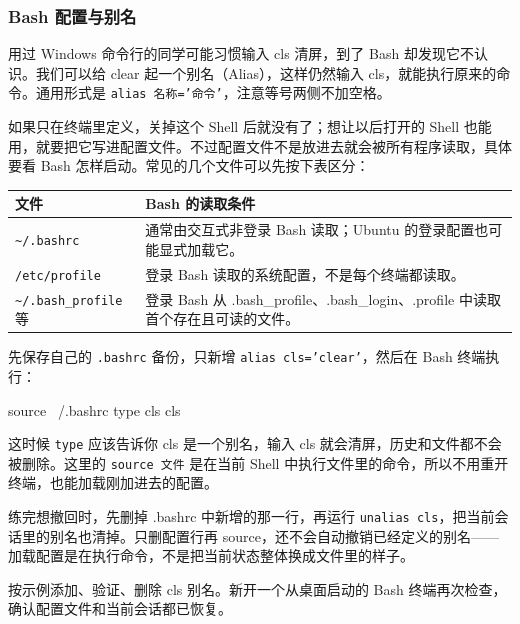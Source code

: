 \subsubsection{Bash 配置与别名}
\label{sec:bash-config}
用过 Windows 命令行的同学可能习惯输入 cls 清屏，到了 Bash 却发现它不认识。我们可以给 clear 起一个别名（Alias），这样仍然输入 cls，就能执行原来的命令。通用形式是 \texttt{alias 名称='命令'}，注意等号两侧不加空格。

如果只在终端里定义，关掉这个 Shell 后就没有了；想让以后打开的 Shell 也能用，就要把它写进配置文件。不过配置文件不是放进去就会被所有程序读取，具体要看 Bash 怎样启动。常见的几个文件可以先按下表区分：
\begin{center}
\begin{tabular}{p{}p{}}
\toprule
文件 & Bash 的读取条件\\
\midrule
\texttt{\textasciitilde/.bashrc} & 通常由交互式非登录 Bash 读取；Ubuntu 的登录配置也可能显式加载它。\\
\texttt{/etc/profile} & 登录 Bash 读取的系统配置，不是每个终端都读取。\\
\texttt{\textasciitilde/.bash\_profile} 等 & 登录 Bash 从 .bash\_profile、.bash\_login、.profile 中读取首个存在且可读的文件。\\
\bottomrule
\end{tabular}
\end{center}
\begin{example}
先保存自己的 \texttt{.bashrc} 备份，只新增 \texttt{alias cls='clear'}，然后在 Bash 终端执行：


\begin{tbash}
source ~/.bashrc
type cls
cls
\end{tbash}


这时候 \texttt{type} 应该告诉你 cls 是一个别名，输入 cls 就会清屏，历史和文件都不会被删除。这里的 \texttt{source 文件} 是在当前 Shell 中执行文件里的命令，所以不用重开终端，也能加载刚加进去的配置。

练完想撤回时，先删掉 .bashrc 中新增的那一行，再运行 \texttt{unalias cls}，把当前会话里的别名也清掉。只删配置行再 source，还不会自动撤销已经定义的别名——加载配置是在执行命令，不是把当前状态整体换成文件里的样子。
\end{example}
\begin{exercise}\label{ex:v1-shell-alias}
按示例添加、验证、删除 cls 别名。新开一个从桌面启动的 Bash 终端再次检查，确认配置文件和当前会话都已恢复。
\end{exercise}


